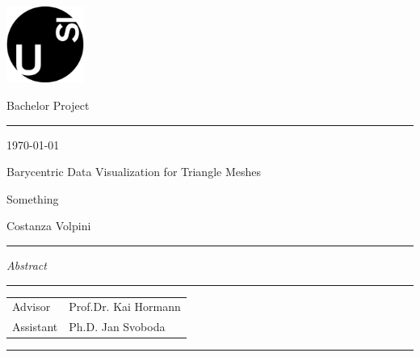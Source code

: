 \documentclass[12pt]{article}
\theoremstyle{definition}
\theoremstyle{definition}
\theoremstyle{plain}
\theoremstyle{plain}
\theoremstyle{plain}
\theoremstyle{plain}
\theoremstyle{definition}
\theoremstyle{remark}
\theoremstyle{remark}
\theoremstyle{remark}
\theoremstyle{remark}
\newcommand{\SUPERTITLE}{Bachelor Project}
\newcommand{\TITLE}{Barycentric Data Visualization for Triangle Meshes}
\newcommand{\SUBTITLE}{Something}
\newcommand{\AUTHOR}{Costanza Volpini}
\newcommand{\ADVISOR}{Prof.Dr. Kai Hormann}
\newcommand{\ASSISTANT}{Ph.D. Jan Svoboda}
\begin{document}

\thispagestyle{empty}

\includegraphics[height=2.5cm]{usi-logo.png} \vspace{-1.42cm}

\begin{flushright}
  {\large \SUPERTITLE}\vspace{-.5cm}

  \rule{0.925\textwidth}{0.4pt}\vspace{-.2cm}

  {\small \today}
\end{flushright}

\vspace{2cm} {\fontsize{20pt}{20pt}\selectfont \TITLE }

{\SUBTITLE}

\vspace{1cm} {\Large \AUTHOR}

\vspace{-.2cm}\rule{\textwidth}{0.4pt}

\textit{Abstract}

\lipsum[1]

\vspace{\fill}
\rule{\textwidth}{0.4pt}

\begin{small}
  \begin{tabular}{@{}ll@{}}
    Advisor   & \ADVISOR   \\
    Assistant & \ASSISTANT
  \end{tabular}
\end{small}

\vspace{-.1cm}\rule{\textwidth}{0.4pt}
\end{document}
